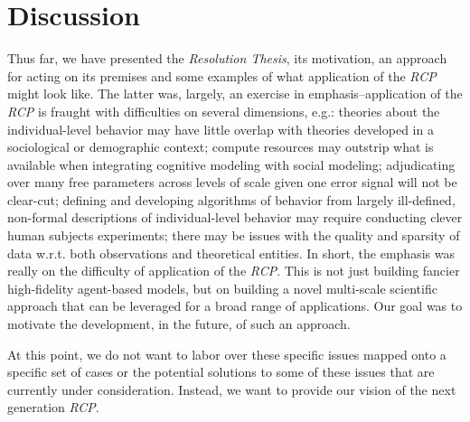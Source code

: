 \documentclass{article}
\begin{document}



\section{Discussion}
Thus far, we have presented the \textit{Resolution Thesis}, its motivation, an approach for acting on its premises and some examples of what application of the \textit{RCP} might look like.  The latter was, largely, an exercise in emphasis--application of the \textit{RCP} is fraught with difficulties on several dimensions, e.g.:  theories about the individual-level behavior may have little overlap with theories developed in a sociological or demographic context; compute resources may outstrip what is available when integrating cognitive modeling with social modeling; adjudicating over many free parameters across levels of scale given one error signal will not be clear-cut; defining and developing algorithms of behavior from largely ill-defined, non-formal descriptions of individual-level behavior may require conducting clever human subjects experiments; there may be issues with the quality and sparsity of data w.r.t. both observations and theoretical entities.  In short, the emphasis was really on the difficulty of application of the \textit{RCP}.  This is not just building fancier high-fidelity agent-based models, but on building a novel multi-scale scientific approach that can be leveraged for a broad range of applications.  Our goal was to motivate the development, in the future, of such an approach.
  
At this point, we do not want to labor over these specific issues mapped onto a specific set of cases or the potential solutions to some of these issues that are currently under consideration\cite{orr2018brims}.  Instead, we want to provide our vision of the next generation \textit{RCP}. 
\end{document}
